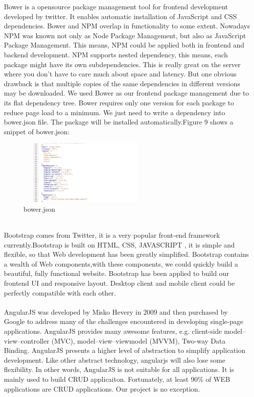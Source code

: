 \documentclass[12pt,oneside,a4paper]{article}
\begin{document}
Bower is a opensource package management tool for frontend development developed by twitter. It enables automatic installation of JavaScript and CSS dependencies. Bower and NPM overlap in functionality to some extent. Nowadays NPM was known not only as Node Package Management, but also as JavaScript Package Management. This means, NPM could  be applied both in frontend and backend development. NPM supports nested dependency, this means, each package might have its own subdependencies. This is really great on the server where you don't have to care much about space and latency. But one obvious drawback is that multiple copies of the same dependencies in different versions may be downloaded. We used Bower as our frontend package management due to its flat dependency tree. Bower requires only one version for each package to reduce page load to a minimum. We just need to write a dependency into bower.json file. The package will be installed automatically.Figure 9 shows a snippet of bower.json:\\
\begin{figure}[htb]
\centering
\includegraphics[width=250px, height=120px]{bower.png}
\caption{bower.json}
\label{picture-label9}
\end{figure}\\
Bootstrap comes from Twitter, it is a very popular front-end framework currently.Bootstrap is built on HTML, CSS, JAVASCRIPT , it is simple and flexible, so that Web development has been greatly simplified. Bootstrap contains a wealth of Web components,with these components, we could quickly build a beautiful, fully functional website. Bootstrap has been applied to build our frontend UI and responsive layout. Desktop client and mobile client could be perfectly compatible with each other.\\\\
AngularJS was developed by Misko Hevery in 2009 and then purchased by Google to address many of the challenges encountered in developing single-page applications. AngularJS provides many awesome features, e.g. client-side model–view–controller (MVC), model–view–viewmodel (MVVM), Two-way Data Binding. AngularJS  presents a higher level of abstraction to simplify application development. Like other abstract technology, angularjs will also lose some flexibility. In other words, AngularJS is not suitable for all applications. It is mainly used to build CRUD applicaiton. Fortunately, at least 90\% of WEB applications are CRUD applications. Our project is no exception.\\
\end{document}
